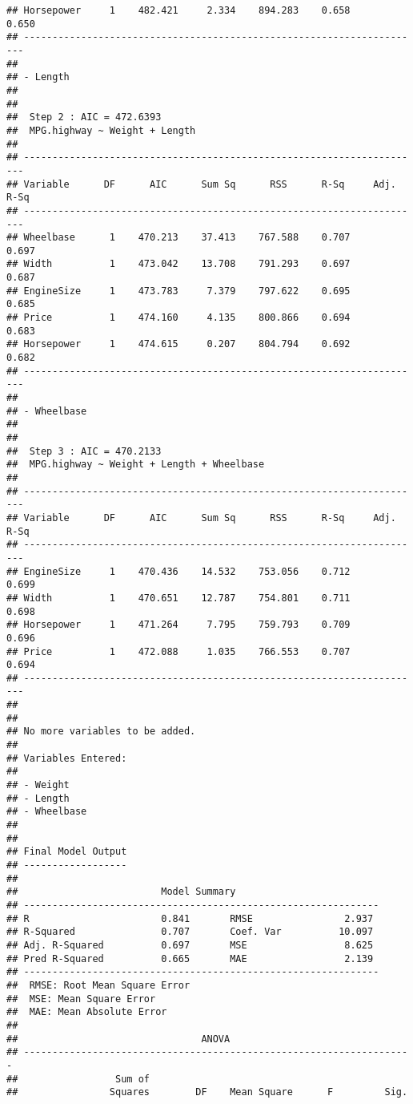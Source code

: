 \documentclass[
]{book}
\begin{document}
\begin{verbatim}
## Horsepower     1    482.421     2.334    894.283    0.658        0.650 
## ----------------------------------------------------------------------
## 
## - Length 
## 
## 
##  Step 2 : AIC = 472.6393 
##  MPG.highway ~ Weight + Length 
## 
## ----------------------------------------------------------------------
## Variable      DF      AIC      Sum Sq      RSS      R-Sq     Adj. R-Sq 
## ----------------------------------------------------------------------
## Wheelbase      1    470.213    37.413    767.588    0.707        0.697 
## Width          1    473.042    13.708    791.293    0.697        0.687 
## EngineSize     1    473.783     7.379    797.622    0.695        0.685 
## Price          1    474.160     4.135    800.866    0.694        0.683 
## Horsepower     1    474.615     0.207    804.794    0.692        0.682 
## ----------------------------------------------------------------------
## 
## - Wheelbase 
## 
## 
##  Step 3 : AIC = 470.2133 
##  MPG.highway ~ Weight + Length + Wheelbase 
## 
## ----------------------------------------------------------------------
## Variable      DF      AIC      Sum Sq      RSS      R-Sq     Adj. R-Sq 
## ----------------------------------------------------------------------
## EngineSize     1    470.436    14.532    753.056    0.712        0.699 
## Width          1    470.651    12.787    754.801    0.711        0.698 
## Horsepower     1    471.264     7.795    759.793    0.709        0.696 
## Price          1    472.088     1.035    766.553    0.707        0.694 
## ----------------------------------------------------------------------
## 
## 
## No more variables to be added.
## 
## Variables Entered: 
## 
## - Weight 
## - Length 
## - Wheelbase 
## 
## 
## Final Model Output 
## ------------------
## 
##                         Model Summary                          
## --------------------------------------------------------------
## R                       0.841       RMSE                2.937 
## R-Squared               0.707       Coef. Var          10.097 
## Adj. R-Squared          0.697       MSE                 8.625 
## Pred R-Squared          0.665       MAE                 2.139 
## --------------------------------------------------------------
##  RMSE: Root Mean Square Error 
##  MSE: Mean Square Error 
##  MAE: Mean Absolute Error 
## 
##                                ANOVA                                 
## --------------------------------------------------------------------
##                 Sum of                                              
##                Squares        DF    Mean Square      F         Sig. 

\end{verbatim}
\end{document}
